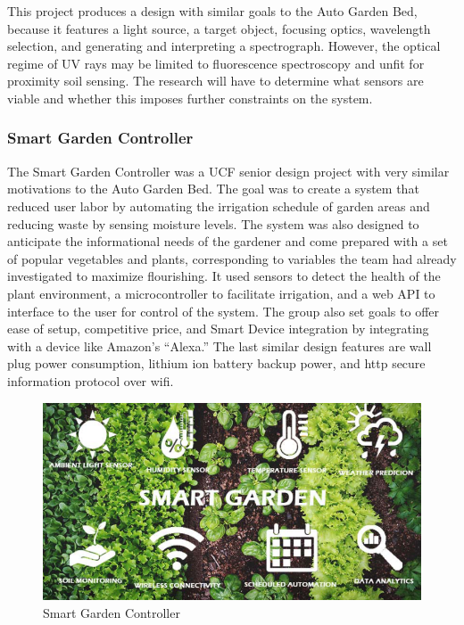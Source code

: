 This project produces a design with similar goals to the Auto Garden Bed, because it features a light source, a target object, focusing optics, wavelength selection, and generating and interpreting a spectrograph. However, the optical regime of UV rays may be limited to fluorescence spectroscopy and unfit for proximity soil sensing. The research will have to determine what sensors are viable and whether this imposes further constraints on the system.

\subsubsection{Smart Garden Controller}
The Smart Garden Controller was a UCF senior design project with very similar motivations to the Auto Garden Bed. The goal was to create a system that reduced user labor by automating the irrigation schedule of garden areas and reducing waste by sensing moisture levels. The system was also designed to anticipate the informational needs of the gardener and come prepared with a set of popular vegetables and plants, corresponding to variables the team had already investigated to maximize flourishing. It used sensors to detect the health of the plant environment, a microcontroller to facilitate irrigation, and a web API to interface to the user for control of the system. The group also set goals to offer ease of setup, competitive price, and Smart Device integration by integrating with a device like Amazon’s “Alexa.” The last similar design features are wall plug power consumption, lithium ion battery backup power, and http secure information protocol over wifi.
\begin{figure}[H]
    \caption{Smart Garden Controller}
    \centering
    \includegraphics[width=\textwidth]{images/3-1-3Pic.png}
\end{figure}
